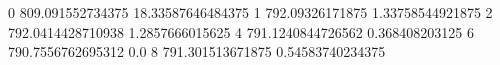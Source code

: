 0 809.091552734375 18.33587646484375
1 792.09326171875 1.33758544921875
2 792.0414428710938 1.2857666015625
4 791.1240844726562 0.368408203125
6 790.7556762695312 0.0
8 791.301513671875 0.54583740234375
